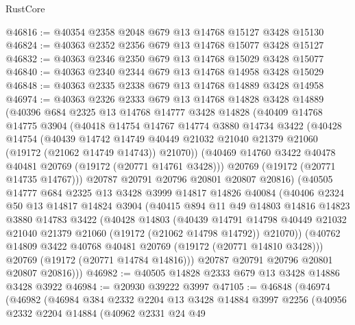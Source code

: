 \begin{lexlean}{RustCore}
\begin{coremodule}
@46816 := @40354 @2358 @2048 @679 @13 @14768 @15127 @3428 @15130
@46824 := @40363 @2352 @2356 @679 @13 @14768 @15077 @3428 @15127
@46832 := @40363 @2346 @2350 @679 @13 @14768 @15029 @3428 @15077
@46840 := @40363 @2340 @2344 @679 @13 @14768 @14958 @3428 @15029
@46848 := @40363 @2335 @2338 @679 @13 @14768 @14889 @3428 @14958
@46974 := @40363
    @2326
    @2333
    @679
    @13
    @14768
    @14828
    @3428
    @14889
    (@40396
      @684
      @2325
      @13
      @14768
      @14777
      @3428
      @14828
      (@40409
        @14768
        @14775
        @3904
        (@40418
          @14754
          @14767
          @14774
          @3880
          @14734
          @3422
          (@40428
            @14754
            (@40439
              @14742
              @14749
              @40449
              @21032
              @21040
              @21379
              @21060
              (@19172 (@21062 @14749 @14743))
              @21070))
          (@40469 @14760 @3422 @40478 @40481 @20769 (@19172 (@20771 @14761 @3428)))
          @20769
          (@19172 (@20771 @14735 @14767)))
        @20787
        @20791
        @20796
        @20801
        @20807
        @20816)
      (@40505
        @14777
        @684
        @2325
        @13
        @3428
        @3999
        @14817
        @14826
        @40084
        (@40406
          @2324
          @50
          @13
          @14817
          @14824
          @3904
          (@40415
            @894
            @11
            @49
            @14803
            @14816
            @14823
            @3880
            @14783
            @3422
            (@40428
              @14803
              (@40439
                @14791
                @14798
                @40449
                @21032
                @21040
                @21379
                @21060
                (@19172 (@21062 @14798 @14792))
                @21070))
            (@40762 @14809 @3422 @40768 @40481 @20769 (@19172 (@20771 @14810 @3428)))
            @20769
            (@19172 (@20771 @14784 @14816)))
          @20787
          @20791
          @20796
          @20801
          @20807
          @20816)))
@46982 := @40505 @14828 @2333 @679 @13 @3428 @14886 @3428 @3922
@46984 := @20930 @39222 @3997
@47105 := @46848
    (@46974
      (@46982
        (@46984
          @384
          @2332
          @2204
          @13
          @3428
          @14884
          @3997
          @2256
          (@40956
            @2332
            @2204
            @14884
            (@40962
              @2331
              @24
              @49

\end{coremodule}
\end{lexlean}
